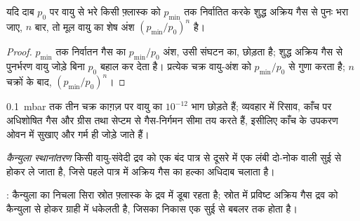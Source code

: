 \begin{proposition}[निर्वातन--पुनर्भरण चक्र]\label{prop:b3:lab-techniques-3:purge-cycles}
यदि दाब $p_0$ पर वायु से भरे किसी फ़्लास्क को $p_{\min}$ तक निर्वातित करके
शुद्ध अक्रिय गैस से पुनः भरा जाए, $n$ बार, तो मूल वायु का शेष अंश $(p_{\min}/p_0)^n$ है।
\end{proposition}

\begin{proof}
$p_{\min}$ तक निर्वातन गैस का $p_{\min}/p_0$ अंश, उसी संघटन का, छोड़ता है;
शुद्ध अक्रिय गैस से पुनर्भरण वायु जोड़े बिना $p_0$ बहाल कर देता है। प्रत्येक चक्र
वायु-अंश को $p_{\min}/p_0$ से गुणा करता है; $n$ चक्रों के बाद, $(p_{\min}/p_0)^n$।
\end{proof}

\qty{0.1}{mbar} तक तीन चक्र काग़ज़ पर वायु का $10^{-12}$ भाग छोड़ते हैं; व्यवहार में रिसाव, काँच पर
अधिशोषित गैस और ग्रीस तथा सेप्टम से गैस-निर्गमन सीमा तय करते हैं, इसीलिए
काँच के उपकरण ओवन में सुखाए और गर्म ही जोड़े जाते हैं।

\begin{definition}[कैन्युला स्थानांतरण]\label{def:b3:lab-techniques-3:cannula}
\emph{कैन्युला स्थानांतरण} किसी वायु-संवेदी द्रव को
एक बंद पात्र से दूसरे में एक लंबी दो-नोक वाली सुई से होकर ले जाता है, जिसे
पहले पात्र में अक्रिय गैस का हल्का अधिदाब चलाता है।
\end{definition}

\begin{omfigure}

{\small {}: कैन्युला का निचला सिरा स्रोत फ़्लास्क के द्रव में
डूबा रहता है; स्रोत में प्रविष्ट अक्रिय गैस द्रव को कैन्युला से होकर
ग्राही में धकेलती है, जिसका निकास एक सुई से बबलर तक होता है।}
\end{omfigure}

